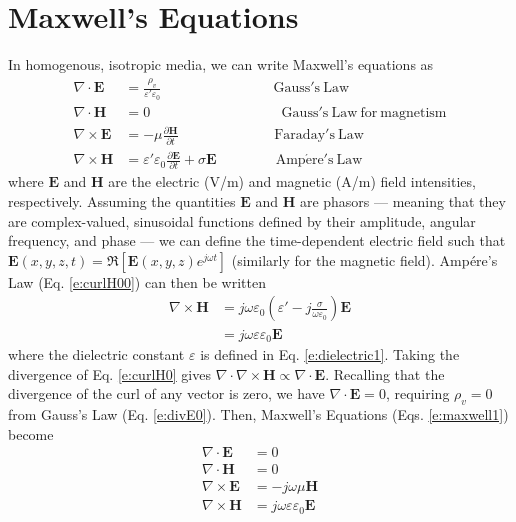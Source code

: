 \documentclass[11pt, oneside]{article}
\begin{document}
\section{Maxwell's Equations}
In homogenous, isotropic media, we can write Maxwell's equations as
	\begin{subequations}
	\label{e:maxwell1}
	\begin{align}
	\nabla\cdot\mathbf{E} &= \frac{\rho_v}{\varepsilon'\varepsilon_0} \qquad\qquad\qquad\qquad \mathrm{Gauss's\ Law} \label{e:divE0} \\
	\nabla\cdot\mathbf{H} &= 0 \qquad\qquad\qquad\qquad\;\;\;\;\; \mathrm{Gauss's\ Law\ for\ magnetism}\\
	\nabla\times\mathbf{E} &= -\mu\frac{\partial \mathbf{H}}{\partial t} \qquad\qquad\qquad\;\;\; \mathrm{Faraday's\ Law} \label{e:curlE0} \\
	\nabla\times\mathbf{H} &= \varepsilon'\varepsilon_0\frac{\partial \mathbf{E}}{\partial t} + \sigma\mathbf{E}
			\qquad\qquad\ \mathrm{Amp\acute{e}re's\ Law} \label{e:curlH00}
	\end{align}
	\end{subequations}
where $\mathbf{E}$ and $\mathbf{H}$ are the electric (V/m) and magnetic (A/m) field intensities, respectively. Assuming the quantities $\mathbf{E}$ and $\mathbf{H}$ are phasors --- meaning that they are complex-valued, sinusoidal functions defined by their amplitude, angular frequency, and phase --- we can define the time-dependent electric field such that $\mathbf{E}(x,y,z,t) = \Re[\mathbf{E}(x,y,z)e^{j\omega t}]$ (similarly for the magnetic field). Amp\'ere's Law (Eq. \ref{e:curlH00}) can then be written
	\begin{equation}
	\label{e:curlH0}
	\begin{aligned}
	\nabla\times\mathbf{H} &= j\omega\varepsilon_0\left(\varepsilon' - j\frac{\sigma}{\omega\varepsilon_0}\right)\mathbf{E} \\
				&= j\omega\varepsilon\varepsilon_0\mathbf{E}
	\end{aligned}
	\end{equation}
where the dielectric constant $\varepsilon$ is defined in Eq. \ref{e:dielectric1}. Taking the divergence of Eq. \ref{e:curlH0} gives $\nabla\cdot\nabla\times\mathbf{H} \propto \nabla\cdot\mathbf{E}$. Recalling that the divergence of the curl of any vector is zero, we have $\nabla\cdot\mathbf{E} = 0$, requiring $\rho_v = 0$ from Gauss's Law (Eq. \ref{e:divE0}). Then, Maxwell's Equations (Eqs. \ref{e:maxwell1}) become
	\begin{subequations}
	\label{e:maxwell2}
	\begin{align}
	\nabla\cdot\mathbf{E} &= 0 \label{e:divE1} \\
	\nabla\cdot\mathbf{H} &= 0 \\
	\nabla\times\mathbf{E} &= -j\omega\mu \mathbf{H} \label{e:curlE1} \\
	\nabla\times\mathbf{H} &= j\omega\varepsilon\varepsilon_0\mathbf{E} \label{e:curlH1}
	\end{align}
	\end{subequations}
	
\end{document}
